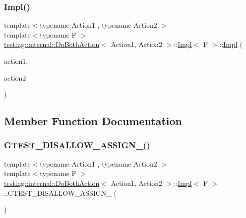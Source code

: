 \subsubsection{\texorpdfstring{Impl()}{Impl()}}
{\footnotesize\ttfamily template$<$typename Action1 , typename Action2 $>$ \\
template$<$typename F $>$ \\
\mbox{\hyperlink{classtesting_1_1internal_1_1_do_both_action}{testing\+::internal\+::\+Do\+Both\+Action}}$<$ Action1, Action2 $>$\+::\mbox{\hyperlink{classtesting_1_1internal_1_1_do_both_action_1_1_impl}{Impl}}$<$ F $>$\+::\mbox{\hyperlink{classtesting_1_1internal_1_1_do_both_action_1_1_impl}{Impl}} (\begin{DoxyParamCaption}\item[{const \mbox{\hyperlink{classtesting_1_1_action}{Action}}$<$ \mbox{\hyperlink{classtesting_1_1internal_1_1_do_both_action_1_1_impl_a83909f0d1addcd1207ff45b128f33802}{Void\+Result}} $>$ \&}]{action1,  }\item[{const \mbox{\hyperlink{classtesting_1_1_action}{Action}}$<$ F $>$ \&}]{action2 }\end{DoxyParamCaption})\hspace{0.3cm}{\ttfamily [inline]}}



\subsection{Member Function Documentation}
\mbox{\label{classtesting_1_1internal_1_1_do_both_action_1_1_impl_a2c00537668b40a1e05f131c3d8e4e88b}} 
\subsubsection{\texorpdfstring{GTEST\_DISALLOW\_ASSIGN\_()}{GTEST\_DISALLOW\_ASSIGN\_()}}
{\footnotesize\ttfamily template$<$typename Action1 , typename Action2 $>$ \\
template$<$typename F $>$ \\
\mbox{\hyperlink{classtesting_1_1internal_1_1_do_both_action}{testing\+::internal\+::\+Do\+Both\+Action}}$<$ Action1, Action2 $>$\+::\mbox{\hyperlink{classtesting_1_1internal_1_1_do_both_action_1_1_impl}{Impl}}$<$ F $>$\+::G\+T\+E\+S\+T\+\_\+\+D\+I\+S\+A\+L\+L\+O\+W\+\_\+\+A\+S\+S\+I\+G\+N\+\_\+ (\begin{DoxyParamCaption}\item[{\mbox{\hyperlink{classtesting_1_1internal_1_1_do_both_action_1_1_impl}{Impl}}$<$ F $>$}]{ }\end{DoxyParamCaption})\hspace{0.3cm}{\ttfamily [private]}}


